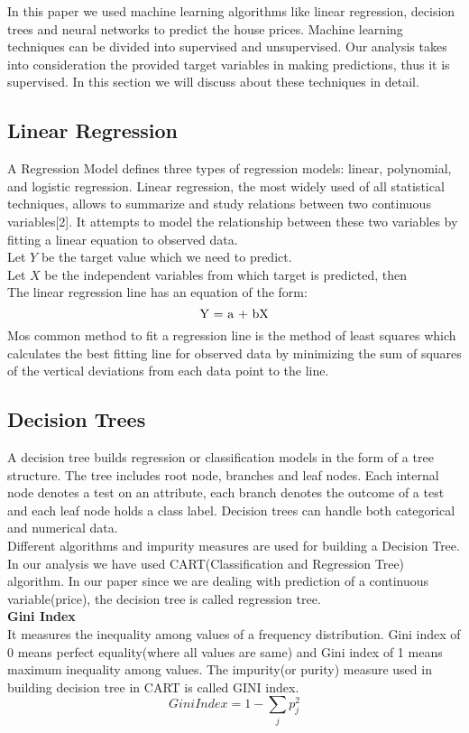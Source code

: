 \documentclass[fleqn,10pt]{SelfArx} %
\begin{document}
In this paper we used machine learning algorithms like linear regression, decision trees and neural networks to predict the house prices. Machine learning techniques can be divided into supervised and unsupervised. Our analysis takes into consideration the provided target variables in making predictions, thus it is supervised. In this section we will discuss about these techniques in detail.
\subsection{Linear Regression}
A Regression Model defines three types of regression models: linear, polynomial, and logistic regression. Linear regression, the most widely used of all statistical techniques, allows to summarize and study relations between two continuous variables[2]. It attempts to model the relationship between these two variables by fitting a linear equation to observed data. \\
Let $Y$ be the target value which we need to predict.\\
Let $X$ be the independent variables from which target is predicted, then\\
The linear regression line has an equation of the form:
\[ $Y = a + bX$\]
 Mos common method to fit a regression line is the method of least squares which calculates the best fitting line for observed data by minimizing the sum of squares of the vertical deviations from each data point to the line. 
 
\subsection{Decision Trees}
A decision tree builds regression or classification models in the form of a tree structure. The tree includes root node, branches and leaf nodes. Each internal node denotes a test on an attribute, each branch denotes the outcome of a test and each leaf node holds a class label. Decision trees can handle both categorical and numerical data. \\
Different algorithms and impurity measures are used for building a Decision Tree. In our analysis we have used CART(Classification and Regression Tree) algorithm. In our paper since we are dealing with prediction of a continuous  variable(price), the decision tree is called regression tree.\\
\textbf{Gini Index}\\
It measures the inequality among values of a frequency distribution. Gini index of 0 means perfect equality(where all values are same) and Gini index of 1 means maximum inequality among values. The impurity(or purity) measure used in building decision tree in CART is called GINI index.
\[Gini Index = 1 - \sum_{j}p_j^2 \]
\end{document}
